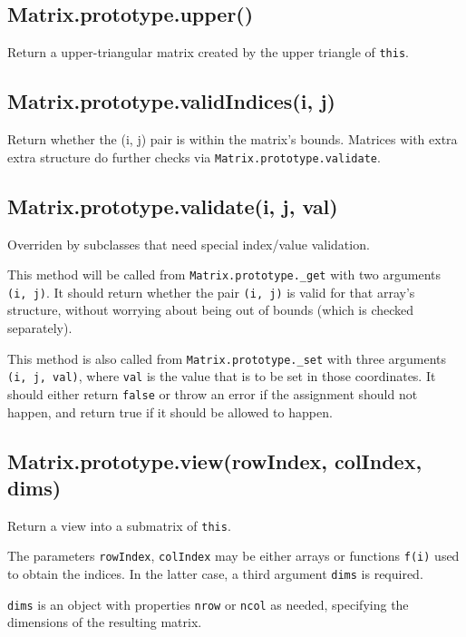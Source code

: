 \documentclass{article}
\begin{document}
    \subsection*{Matrix.prototype.upper()}
    Return a upper-triangular matrix created by the upper triangle of \texttt{this}.


    \subsection*{Matrix.prototype.validIndices(i, j)}
    Return whether the (i, j) pair is within the matrix's bounds. Matrices with extra
extra structure do further checks via \texttt{Matrix.prototype.validate}.


    \subsection*{Matrix.prototype.validate(i, j, val)}
    Overriden by subclasses that need special index/value validation.


This method will be called from \texttt{Matrix.prototype.\_get} with two arguments \texttt{(i, j)}.
It should return whether the pair \texttt{(i, j)} is valid for that array's structure, without
worrying about being out of bounds (which is checked separately).


This method is also called from \texttt{Matrix.prototype.\_set} with three arguments
\texttt{(i, j, val)}, where \texttt{val} is the value that is to be set in those coordinates.
It should either return \texttt{false} or throw an error if the assignment should not
happen, and return true if it should be allowed to happen.


    \subsection*{Matrix.prototype.view(rowIndex, colIndex, dims)}
    Return a view into a submatrix of \texttt{this}.


The parameters \texttt{rowIndex}, \texttt{colIndex}
may be either arrays or functions \texttt{f(i)} used to obtain the indices.
In the latter case, a third argument \texttt{dims} is required.


\texttt{dims} is an object with properties \texttt{nrow} or \texttt{ncol} as needed, specifying the
dimensions of the resulting matrix.
\end{document}
